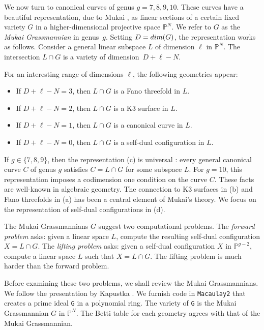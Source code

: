 \documentclass[12pt]{extarticle}
\theoremstyle{definition}
\numberwithin{theorem}{section}
\theoremstyle{plain}\newtheorem{ithm}{Theorem}
\newcommand{\PP}{\mathbb{P}}
\begin{document}
We now turn to canonical curves of genus $g =7,8,9,10$.
These curves have a beautiful representation,
due to Mukai \cite{Mukai, Mukai4, Mukai3, Mukai2},
 as linear sections
of a certain fixed variety $G$ in a higher-dimensional
projective space $\PP^{N}$.
We refer to $G$ as the {\em Mukai Grassmannian} in genus~$g$.
Setting $D = {\rm dim}(G)$, the representation works as follows.
Consider a general linear subspace $L$ of dimension $\ell$ in $\PP^N$.
The intersection $L \cap G$ is a variety of dimension~$D + \ell - N$.  

For an interesting  range of dimensions $\ell$, the following geometries appear:
\begin{itemize}
\item[(a)] If $D + \ell - N =3$, then $L \cap G$ is a Fano threefold in $L$. \vspace{-0.3cm}
\item[(b)] If $D+ \ell - N = 2$,  then $L \cap G$ is a K3 surface in $L$. \vspace{-0.3cm}
\item[(c)] If $D+ \ell -N = 1$,  then $L \cap G$ is a canonical curve in $L$. \vspace{-0.3cm}
\item[(d)] If $D + \ell-N = 0$, then $L \cap G$ is a self-dual configuration in $L$.
\end{itemize}
If $g \in \{7,8,9\}$, then the representation (c) is universal \cite{Mukai4, Mukai3, Mukai2}:
every general canonical curve $C$ of genus $g$ satisfies $C = L \cap G$
for some subspace $L$. For $g=10$, this representation imposes
a codimension one condition on the curve $C$.
These facts are well-known in algebraic geometry.
 The connection to K3 surfaces in (b) and
Fano threefolds in (a) has been a central element of Mukai's theory.
We focus on the  representation of self-dual configurations in (d).

The Mukai Grassmannians $G$ suggest  two computational problems.
The {\em forward problem} asks: given a linear space $L$,
compute the resulting self-dual configuration $X = L \cap G$.
The {\em lifting problem} asks: given a  self-dual configuration $X$ in $\PP^{g-2}$,
compute a linear space $L$ such that $X = L \cap G$. 
The lifting problem is much harder than the forward problem.

Before examining these two problems, we shall review the Mukai Grassmannians.
We follow the presentation by Kapustka \cite{Kap1, Kap2}.
 We furnish code in {\tt Macaulay2}
that creates a prime ideal {\tt G} in a polynomial ring. 
The variety of {\tt G} is the Mukai Grassmannian $G$ in $\PP^N$.
The Betti table for each 
geometry agrees with that of the Mukai Grassmannian.
\end{document}
